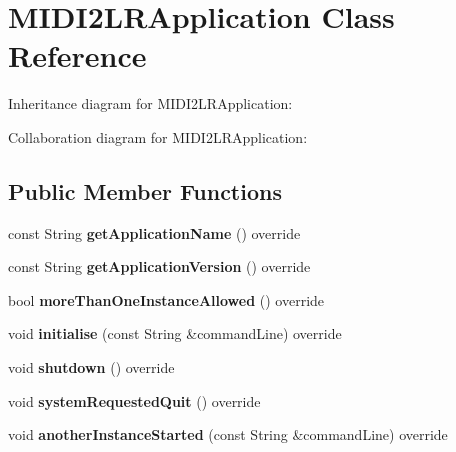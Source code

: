 \hypertarget{class_m_i_d_i2_l_r_application}{}\section{M\+I\+D\+I2\+L\+R\+Application Class Reference}
\label{class_m_i_d_i2_l_r_application}


Inheritance diagram for M\+I\+D\+I2\+L\+R\+Application\+:


Collaboration diagram for M\+I\+D\+I2\+L\+R\+Application\+:
\subsection*{Public Member Functions}
\begin{DoxyCompactItemize}
\item 
const String {\bfseries get\+Application\+Name} () override\hypertarget{class_m_i_d_i2_l_r_application_ac53e19496aa202117c45cae154cf7489}{}\label{class_m_i_d_i2_l_r_application_ac53e19496aa202117c45cae154cf7489}

\item 
const String {\bfseries get\+Application\+Version} () override\hypertarget{class_m_i_d_i2_l_r_application_a51fc49ef00c85168d30427eb77d023c7}{}\label{class_m_i_d_i2_l_r_application_a51fc49ef00c85168d30427eb77d023c7}

\item 
bool {\bfseries more\+Than\+One\+Instance\+Allowed} () override\hypertarget{class_m_i_d_i2_l_r_application_abd55f782b5d696a1d6df5ab3ee03f816}{}\label{class_m_i_d_i2_l_r_application_abd55f782b5d696a1d6df5ab3ee03f816}

\item 
void {\bfseries initialise} (const String \&command\+Line) override\hypertarget{class_m_i_d_i2_l_r_application_ae503f1d36a80e653cfb197664ab1bcdc}{}\label{class_m_i_d_i2_l_r_application_ae503f1d36a80e653cfb197664ab1bcdc}

\item 
void {\bfseries shutdown} () override\hypertarget{class_m_i_d_i2_l_r_application_ab5c41060c26b2d07197651ad3f74f62f}{}\label{class_m_i_d_i2_l_r_application_ab5c41060c26b2d07197651ad3f74f62f}

\item 
void {\bfseries system\+Requested\+Quit} () override\hypertarget{class_m_i_d_i2_l_r_application_a09e3d213ac5693825d76199c20260f3f}{}\label{class_m_i_d_i2_l_r_application_a09e3d213ac5693825d76199c20260f3f}

\item 
void {\bfseries another\+Instance\+Started} (const String \&command\+Line) override\hypertarget{class_m_i_d_i2_l_r_application_a21cbb808b1a642fc6bce2899bcd63cbb}{}\label{class_m_i_d_i2_l_r_application_a21cbb808b1a642fc6bce2899bcd63cbb}

\end{DoxyCompactItemize}


